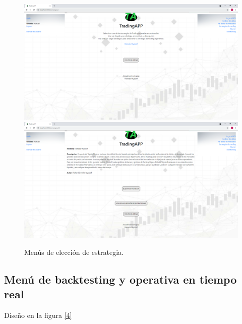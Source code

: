 \begin{figure}[h]
	\includegraphics[width=1.2\textwidth]{imagenes/diseno_final/menu_eleccion_estrategia.png}\newline \\
	\includegraphics[width=1.2\textwidth]{imagenes/diseno_final/menu_eleccion_estrategia_2.png}
	
	\caption{Menús de elección de estrategia.}  \label{3}
\end{figure}

\subsection{Menú de backtesting y operativa en tiempo real}
Diseño en la figura \ref{4}

